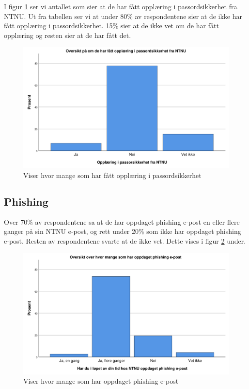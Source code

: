 I figur \ref{fig:case2-passordsikkerhet} ser vi antallet som sier at de har fått opplæring i passordsikkerhet fra NTNU. Ut fra tabellen ser vi at under 80\% av respondentene sier at de ikke har fått opplæring i passordsikkerhet. 15\% sier at de ikke vet om de har fått opplæring og resten sier at de har fått det. 
\begin{figure}[H]
    \centering
    \includegraphics[scale=0.5]{case_2/bilder/spss/opplaring_passordsikk_NTNU.pdf}
    \caption[Opplæring i passordsikkerhet]{Viser hvor mange som har fått opplæring i passordsikkerhet}
    \label{fig:case2-passordsikkerhet}
\end{figure}

\subsection{Phishing}
Over 70\% av respondentene sa at de har oppdaget phishing e-post en eller flere ganger på sin NTNU e-post, og rett under 20\% som ikke har oppdaget phishing e-post. Resten av respondentene svarte at de ikke vet. Dette vises i figur \ref{fig:case2-oppdaget-phishing} under.
\begin{figure}[H]
    \centering
    \includegraphics[scale=0.5]{case_2/bilder/spss/oppdaget_phish.pdf}
    \caption[Oppdaget phishing]{Viser hvor mange som har oppdaget phishing e-post}
    \label{fig:case2-oppdaget-phishing}
\end{figure}

